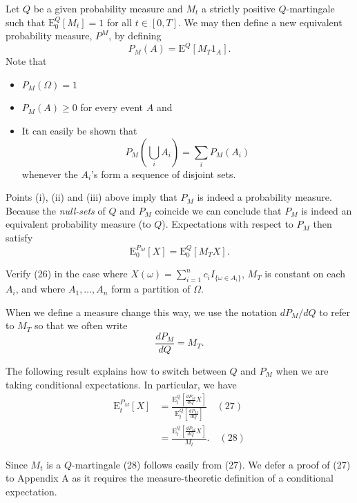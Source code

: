 Let $Q$ be a given probability measure and $M_t$ a strictly positive $Q$-martingale such that $\mathrm{E}_0^Q[M_t]=1$ for all $t\in[0,T]$. We may then define a new equivalent probability measure, $P^M$, by defining
\[P_M(A) = \mathrm{E}^Q\left[M_T 1_A\right].\]
Note that
\begin{itemize}
    \item[(i)] $P_M(\Omega)=1$
    \item[(ii)] $P_M(A)\geq 0$ for every event $A$ and
    \item[(iii)] It can easily be shown that
    \[P_M\left(\bigcup_i A_i\right) = \sum_i P_M\left(A_i\right)\]
    whenever the $A_i$'s form a sequence of disjoint sets.
\end{itemize}
Points (i), (ii) and (iii) above imply that $P_M$ is indeed a probability measure. Because the \textit{null-sets} of $Q$ and $P_M$ coincide we can conclude that $P_M$ is indeed an equivalent probability measure (to $Q$). Expectations with respect to $P_M$ then satisfy
\[\mathrm{E}_0^{P_M}\left[X\right] = \mathrm{E}_0^Q\left[M_T X\right]. \tag{26}\]

\begin{example}
Verify (26) in the case where $X(\omega)=\sum_{i=1}^n c_i I_{\{\omega\in A_i\}}$, $M_T$ is constant on each $A_i$, and where $A_1,\ldots,A_n$ form a partition of $\Omega$.
\end{example}

When we define a measure change this way, we use the notation $dP_M/dQ$ to refer to $M_T$ so that we often write
\[\frac{dP_M}{dQ} = M_T.\]

The following result explains how to switch between $Q$ and $P_M$ when we are taking conditional expectations. In particular, we have
\begin{align*}
\mathrm{E}_t^{P_M}[X] &= \frac{\mathrm{E}_t^Q\left[\frac{dP_M}{dQ} X\right]}{\mathrm{E}_t^Q\left[\frac{dP_M}{dQ}\right]}\quad(27) \\
&= \frac{\mathrm{E}_t^Q\left[\frac{dP_M}{dQ} X\right]}{M_t}. \quad (28)
\end{align*}

Since $M_t$ is a $Q$-martingale (28) follows easily from (27). We defer a proof of (27) to Appendix A as it requires the measure-theoretic definition of a conditional expectation.

